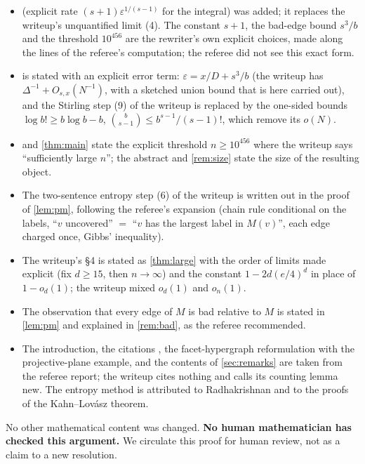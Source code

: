 \documentclass[11pt,a4paper]{article}
\theoremstyle{plain}
\theoremstyle{definition}
\theoremstyle{remark}
\begin{document}
\begin{itemize}[nosep]
\item {} (explicit rate $(s+1)\varepsilon^{1/(s-1)}$ for the integral) was added; it replaces the writeup's unquantified limit (4). The constant $s+1$, the bad-edge bound $s^3/b$ and the threshold $10^{456}$ are the rewriter's own explicit choices, made along the lines of the referee's computation; the referee did not see this exact form.
\item {} is stated with an explicit error term: $\varepsilon=x/D+s^3/b$ (the writeup has $\Delta^{-1}+O_{s,x}(N^{-1})$, with a sketched union bound that is here carried out), and the Stirling step (9) of the writeup is replaced by the one-sided bounds $\log b!\ge b\log b-b$, $\binom b{s-1}\le b^{s-1}/(s-1)!$, which remove its $o(N)$.
\item {} and \cref{thm:main} state the explicit threshold $n\ge10^{456}$ where the writeup says ``sufficiently large $n$''; the abstract and \cref{rem:size} state the size of the resulting object.
\item The two-sentence entropy step (6) of the writeup is written out in the proof of \cref{lem:pm}, following the referee's expansion (chain rule conditional on the labels, ``$v$ uncovered'' $=$ ``$v$ has the largest label in $M(v)$'', each edge charged once, Gibbs' inequality).
\item The writeup's \S4 is stated as \cref{thm:large} with the order of limits made explicit (fix $d\ge15$, then $n\to\infty$) and the constant $1-2d(e/4)^d$ in place of $1-o_d(1)$; the writeup mixed $o_d(1)$ and $o_n(1)$.
\item The observation that every edge of $M$ is bad relative to $M$ is stated in \cref{lem:pm} and explained in \cref{rem:bad}, as the referee recommended.
\item The introduction, the citations \cite{Vizing64,PS89,Kahn96,AK97,Furedi86,Berge89,BFH24a,BFH24b,MA25,KKKMO21,Bregman73,Radhakrishnan97,AF08,CR11}, the facet-hypergraph reformulation with the projective-plane example, and the contents of \cref{sec:remarks} are taken from the referee report; the writeup cites nothing and calls its counting lemma new. The entropy method is attributed to Radhakrishnan and to the proofs of the Kahn--Lov\'asz theorem.
\end{itemize}
No other mathematical content was changed.
\textbf{No human mathematician has checked this argument.} We circulate this proof for human review, not as a claim to a new resolution.
\end{document}
